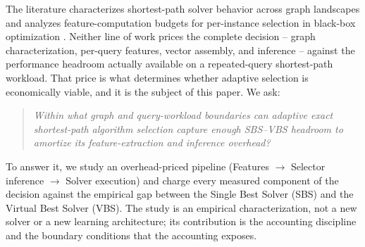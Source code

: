\documentclass[conference]{IEEEtran}
\begin{document}
The literature characterizes shortest-path solver behavior across graph landscapes \cite{gholami2026} and analyzes feature-computation budgets for per-instance selection in black-box optimization \cite{vanderblom2026}. Neither line of work prices the complete decision -- graph characterization, per-query features, vector assembly, and inference -- against the performance headroom actually available on a repeated-query shortest-path workload. That price is what determines whether adaptive selection is economically viable, and it is the subject of this paper. We ask:

\begin{quote}
\emph{Within what graph and query-workload boundaries can adaptive exact shortest-path algorithm selection capture enough SBS--VBS headroom to amortize its feature-extraction and inference overhead?}
\end{quote}

To answer it, we study an overhead-priced pipeline (Features $\rightarrow$ Selector inference $\rightarrow$ Solver execution) and charge every measured component of the decision against the empirical gap between the Single Best Solver (SBS) and the Virtual Best Solver (VBS). The study is an empirical characterization, not a new solver or a new learning architecture; its contribution is the accounting discipline and the boundary conditions that the accounting exposes.
\end{document}
